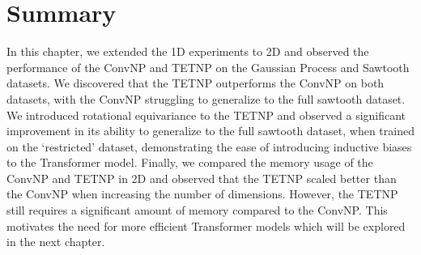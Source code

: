 \documentclass[../../main.tex]{subfiles}
\begin{document}
\section{Summary}

In this chapter, we extended the 1D experiments to 2D and observed the performance of the ConvNP and TETNP on the Gaussian Process and Sawtooth datasets. We discovered that the TETNP outperforms the ConvNP on both datasets, with the ConvNP struggling to generalize to the full sawtooth dataset. We introduced rotational equivariance to the TETNP and observed a significant improvement in its ability to generalize to the full sawtooth dataset, when trained on the `restricted' dataset, demonstrating the ease of introducing inductive biases to the Transformer model. Finally, we compared the memory usage of the ConvNP and TETNP in 2D and observed that the TETNP scaled better than the ConvNP when increasing the number of dimensions. However, the TETNP still requires a significant amount of memory compared to the ConvNP. This motivates the need for more efficient Transformer models which will be explored in the next chapter. 


\ifSubfilesClassLoaded{%
    \printbibliography{}
}{} 
\end{document}
